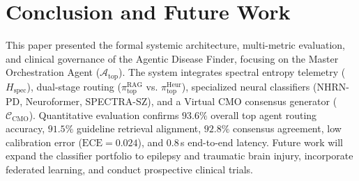 \documentclass[runningheads]{llncs}
\begin{document}
\section{Conclusion and Future Work}
This paper presented the formal systemic architecture, multi-metric evaluation, and clinical governance of the Agentic Disease Finder, focusing on the Master Orchestration Agent ($\mathcal{A}_{\text{top}}$). The system integrates spectral entropy telemetry ($H_{\text{spec}}$), dual-stage routing ($\pi_{\text{top}}^{\text{RAG}}$ vs. $\pi_{\text{top}}^{\text{Heur}}$), specialized neural classifiers (NHRN-PD, Neuroformer, SPECTRA-SZ), and a Virtual CMO consensus generator ($\mathcal{C}_{\text{CMO}}$). Quantitative evaluation confirms $93.6\%$ overall top agent routing accuracy, $91.5\%$ guideline retrieval alignment, $92.8\%$ consensus agreement, low calibration error ($\text{ECE}=0.024$), and $0.8$\,s end-to-end latency. Future work will expand the classifier portfolio to epilepsy and traumatic brain injury, incorporate federated learning, and conduct prospective clinical trials.
\end{document}
